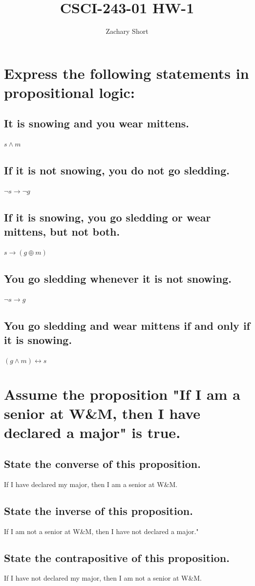\documentclass{article}
\title{CSCI-243-01 HW-1}
\author{Zachary Short}
\begin{document}
\maketitle

\section{Express the following statements in propositional logic:}
    \subsection{It is snowing and you wear mittens.} $s \land m$
    \subsection{If it is not snowing, you do not go sledding.} $\neg s \rightarrow \neg g$
    \subsection{If it is snowing, you go sledding or wear mittens, but not both.} $s \rightarrow (g \oplus m)$
    \subsection{You go sledding whenever it is not snowing.} $\neg s \rightarrow g$
    \subsection{You go sledding and wear mittens if and only if it is snowing.}$(g \land m) \leftrightarrow s$

\section{Assume the proposition "If I am a senior at W\&M, then I have declared a major" is true.}
    \subsection{State the converse of this proposition.} If I have declared my major, then I am a senior at W\&M.
    \subsection{State the inverse of this proposition.} If I am not a senior at W\&M, then I have not declared a major." 
    \subsection{State the contrapositive of this proposition.} If I have not declared my major, then I am not a senior at W\&M. 
\end{document}
